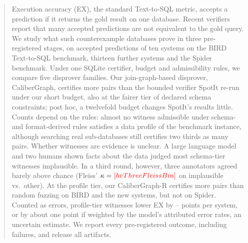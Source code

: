 \begin{abstract}
Execution accuracy (EX), the standard Text-to-SQL metric, accepts a prediction if it returns the gold result on one database. Recent verifiers report that many accepted predictions are not equivalent to the gold query. We study what such counterexample databases prove in three pre-registered stages, on  accepted predictions of ten systems on the BIRD Text-to-SQL benchmark, thirteen further systems and the Spider benchmark. Under one SQLite certifier, budget and admissibility rules, we compare five disprover families. Our join-graph-based disprover, CaliberGraph, certifies more pairs than the bounded verifier SpotIt re-run under our short budget, also at the fairer tier of declared schema constraints; post hoc, a twelvefold budget changes SpotIt's results little. Counts depend on the rules: almost no witness admissible under schema- and format-derived rules satisfies a data profile of the benchmark instance, although searching real sub-databases still certifies two thirds as many pairs. Whether witnesses are evidence is unclear. A large language model and two humans shown facts about the data judged most schema-tier witnesses implausible. In a third round, however, three annotators agreed barely above chance (Fleiss' $\kappa=\V{hvThreeFleissBin}$ on implausible vs.\ other). At the profile tier, our CaliberGraph-R certifies more pairs than random fuzzing on BIRD and the new systems, but not on Spider. Counted as errors, profile-tier witnesses lower EX by -- points per system, or by about one point if weighted by the model's attributed error rates, an uncertain estimate. We report every pre-registered outcome, including failures, and release all artifacts.
\end{abstract}
